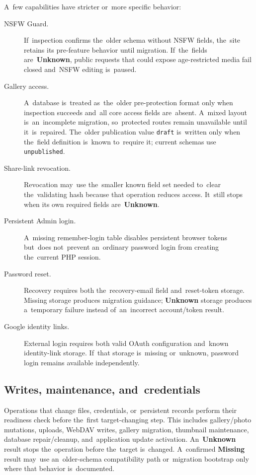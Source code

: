\documentclass[11pt,a4paper]{article}
\newcommand{\ui}[1]{\textbf{#1}}
\newcommand{\codeword}[1]{\nolinkurl{#1}}
\begin{document}
A~few capabilities have stricter or~more specific behavior:

\begin{description}
  \item[NSFW Guard.] If~inspection confirms the~older schema without NSFW
  fields, the~site retains its pre-feature behavior until migration.
  If~the~fields are~\ui{Unknown}, public requests that could expose
  age-restricted media fail closed and~NSFW editing is~paused.
  \item[Gallery access.] A~database is~treated as~the~older pre-protection
  format only when inspection succeeds and~all core access fields are~absent.
  A~mixed layout is~an~incomplete migration, so~protected routes remain
  unavailable until it~is~repaired. The~older publication value \codeword{draft}
  is~written only when the~field definition is~known to~require it; current
  schemas use \codeword{unpublished}.
  \item[Share-link revocation.] Revocation may~use the~smaller known field set
  needed to~clear the~validating hash because that operation reduces access.
  It~still stops when its own required fields are~\ui{Unknown}.
  \item[Persistent Admin login.] A~missing remember-login table disables
  persistent browser tokens but~does not~prevent an~ordinary password login from
  creating the~current PHP session.
  \item[Password reset.] Recovery requires both the~recovery-email field
  and~reset-token storage. Missing storage produces migration guidance;
  \ui{Unknown} storage produces a~temporary failure instead of~an~incorrect
  account/token result.
  \item[Google identity links.] External login requires both valid OAuth
  configuration and~known identity-link storage. If~that storage is~missing
  or~unknown, password login remains available independently.
\end{description}

\subsection{Writes, maintenance, and~credentials}

Operations that change files, credentials, or~persistent records perform their
readiness check before the~first target-changing step. This includes
gallery/photo mutations, uploads, WebDAV writes, gallery migration, thumbnail
maintenance, database repair/cleanup, and~application update activation.
An~\ui{Unknown} result stops the~operation before the~target is~changed.
A~confirmed \ui{Missing} result may~use an~older-schema compatibility path
or~migration bootstrap only where that behavior is~documented.
\end{document}
